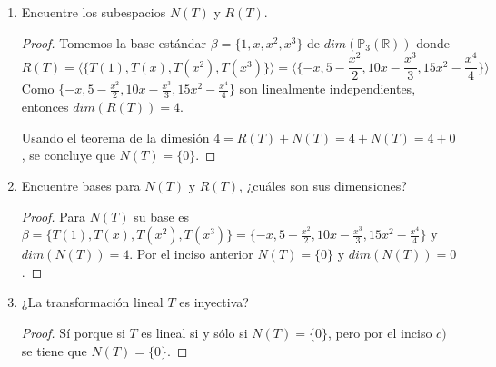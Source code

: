 \documentclass[11pt,letterpaper]{article}
\newcommand{\R}{\mathbb{R}}
\begin{document}
\begin{enumerate}
\begin{enumerate}[label=(\alph*)]
    \item Encuentre los subespacios $N(T)$ y $R(T)$.
    \begin{proof}
        Tomemos la base estándar $\beta = \{ 1, x, x^2, x^3 \}$ de $dim (\mathds{P}_3(\R))$ donde
        \[ R(T) = \langle \{ T(1), T(x), T(x^2), T(x^3) \} \rangle =
            \langle \{ -x, 5-\frac{x^2}{2}, 10x -\frac{x^3}{3}, 15x^2 - \frac{x^4}{4} \}\rangle \]
        Como $\{ -x, 5-\frac{x^2}{2}, 10x -\frac{x^3}{3}, 15x^2 - \frac{x^4}{4} \}$ son linealmente
        independientes, entonces $dim(R(T)) = 4$.
        
        Usando el teorema de la dimesión $4 = R(T) + N(T) = 4 + N(T) = 4 + 0$, se concluye que
        $N(T) = \{ 0 \}$.
    \end{proof}

    \item Encuentre bases para $N(T)$ y $R(T)$, ¿cuáles son sus dimensiones?
    \begin{proof}
        Para $N(T)$ su base es
        $\beta = \{ T(1), T(x), T(x^2), T(x^3) \} = \{ -x, 5-\frac{x^2}{2}, 10x -\frac{x^3}{3}, 15x^2 - \frac{x^4}{4} \}$
        y $dim(N(T))= 4$. Por el inciso anterior $N(T) = \{ 0 \}$ y $dim(N(T)) = 0$.
    \end{proof}

    \item ¿La transformación lineal $T$ es inyectiva?
    \begin{proof}
        Sí porque si $T$ es lineal si y sólo si $N(T) = \{ 0 \}$, pero por el inciso $c)$
        se tiene que $N(T) = \{ 0 \}$.
    \end{proof}
\end{enumerate}

\end{enumerate}





\end{document}
